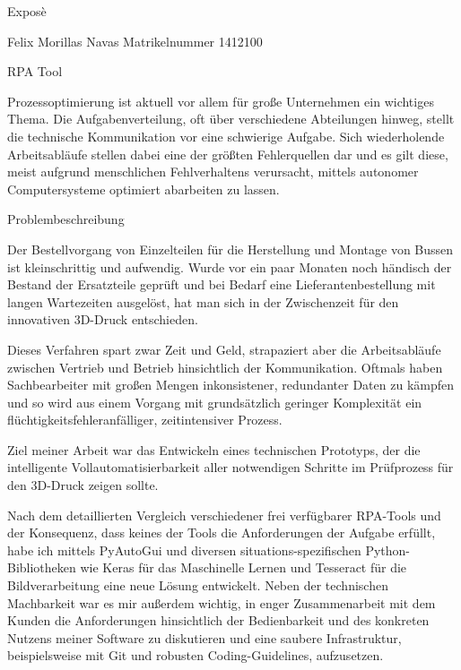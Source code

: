 Exposè

Felix Morillas Navas
Matrikelnummer 1412100

RPA Tool

Prozessoptimierung ist aktuell vor allem für große Unternehmen ein wichtiges Thema. Die Aufgabenverteilung, oft über verschiedene Abteilungen hinweg, stellt die technische Kommunikation vor eine schwierige Aufgabe. Sich wiederholende Arbeitsabläufe stellen dabei eine der größten Fehlerquellen dar und es gilt diese, meist aufgrund menschlichen Fehlverhaltens verursacht, mittels autonomer Computersysteme optimiert abarbeiten zu lassen.

Problembeschreibung

Der Bestellvorgang von Einzelteilen für die Herstellung und Montage von Bussen ist kleinschrittig und aufwendig. 
Wurde vor ein paar Monaten noch händisch der Bestand der Ersatzteile geprüft und bei Bedarf eine Lieferantenbestellung mit langen Wartezeiten ausgelöst, hat man sich in der Zwischenzeit für den innovativen 3D-Druck entschieden.

Dieses Verfahren spart zwar Zeit und Geld, strapaziert aber die Arbeitsabläufe zwischen Vertrieb und Betrieb hinsichtlich der Kommunikation. Oftmals haben Sachbearbeiter mit großen Mengen inkonsistener, redundanter Daten zu kämpfen und so wird aus einem Vorgang mit grundsätzlich geringer Komplexität ein flüchtigkeitsfehleranfälliger, zeitintensiver Prozess.

Ziel meiner Arbeit war das Entwickeln eines technischen Prototyps, der die intelligente Vollautomatisierbarkeit aller notwendigen Schritte im Prüfprozess für den 3D-Druck zeigen sollte. 

Nach dem detaillierten Vergleich verschiedener frei verfügbarer RPA-Tools und der Konsequenz, dass keines der Tools die Anforderungen der Aufgabe erfüllt, habe ich mittels PyAutoGui und diversen situations-spezifischen Python-Bibliotheken wie Keras für das Maschinelle Lernen und Tesseract für die Bildverarbeitung eine neue Lösung entwickelt. 
Neben der technischen Machbarkeit war es mir außerdem wichtig, in enger Zusammenarbeit mit dem Kunden die Anforderungen hinsichtlich der Bedienbarkeit und des konkreten Nutzens meiner Software zu diskutieren und eine saubere Infrastruktur, beispielsweise mit Git und robusten Coding-Guidelines, aufzusetzen.


